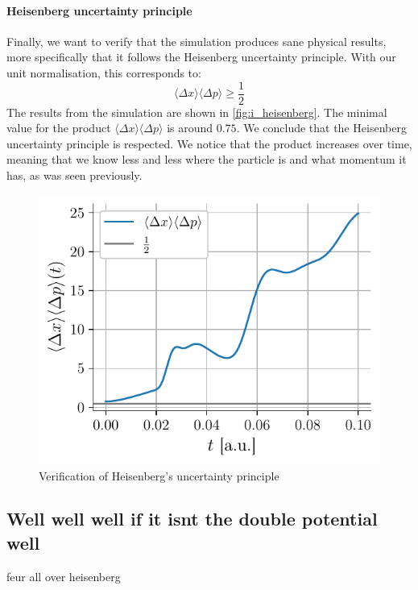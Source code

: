 \paragraph{Heisenberg uncertainty principle} Finally, we want to verify that the simulation produces sane physical results, more specifically that it follows the Heisenberg uncertainty principle. With our unit normalisation, this corresponds to:
\begin{equation}
    \langle \Delta x \rangle \langle \Delta p \rangle \ge \frac{1}{2}
\end{equation}
The results from the simulation are shown in \autoref{fig:i_heisenberg}. The minimal value for the product \(\langle \Delta x \rangle \langle \Delta p \rangle\) is around \(0.75\). We conclude that the Heisenberg uncertainty principle is respected. We notice that the product increases over time, meaning that we know less and less where the particle is and what momentum it has, as was seen previously.

\begin{figure}[h]
    \centering
    \includegraphics[width=0.6\linewidth]{figures/i_heisenberg.pdf}
    \caption{Verification of Heisenberg's uncertainty principle}
    \label{fig:i_heisenberg}
\end{figure}

\subsection{Well well well if it isnt the double potential well}

feur all over heisenberg
